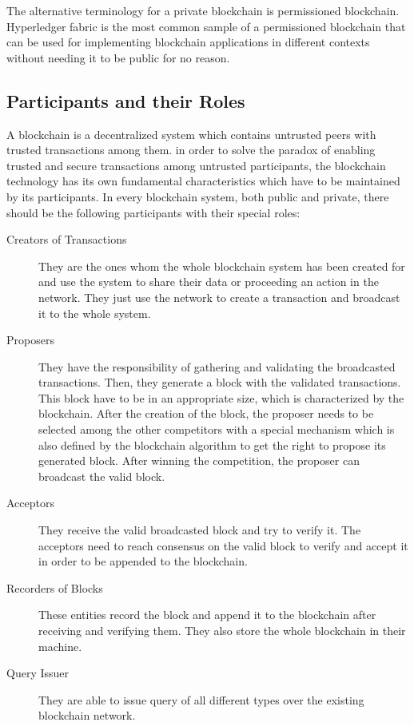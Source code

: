 \documentclass[a4paper]{article}
\begin{document}
The alternative terminology for a private blockchain is permissioned blockchain. Hyperledger fabric is the most common sample of a permissioned blockchain that can be used for implementing blockchain applications in different contexts without needing it to be public for no reason. 

\subsection{Participants and their Roles}
\label{sec:participants}
A blockchain is a decentralized system which contains untrusted peers with trusted transactions among them. in order to solve the paradox of enabling trusted and secure transactions among untrusted participants, the blockchain technology has its own fundamental characteristics which have to be maintained by its participants. In every blockchain system, both public and private, there should be the following participants with their special roles:

\begin{description}
\item[Creators of Transactions] They are the ones whom the whole blockchain system has been created for and use the system to share their data or proceeding an action in the network. They just use the network to create a transaction and broadcast it to the whole system.
\item[Proposers] They have the responsibility of gathering and validating the broadcasted transactions. Then, they generate a block with the validated transactions. This block have to be in an appropriate size, which is characterized by the blockchain. After the creation of the block, the proposer needs to be selected among the other competitors with a special mechanism which is also defined by the blockchain algorithm to get the right to propose its generated block. After winning the competition, the proposer can broadcast the valid block.   
\item[Acceptors] They receive the valid broadcasted block and try to verify it. The acceptors need to reach consensus on the valid block to verify and accept it in order to be appended to the blockchain.
\item[Recorders of Blocks] These entities record the block and append it to the blockchain after receiving and verifying them. They also store the whole blockchain in their machine. 
\item[Query Issuer] They are able to issue query of all different types over the existing blockchain network. 
\end{description} 

\newpage

\begin{thebibliography}{9}
  
\end{thebibliography}
\end{document}
